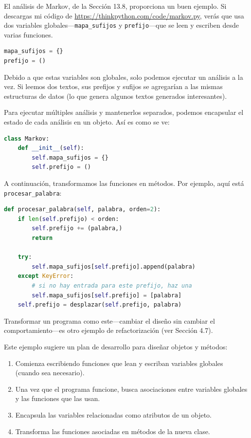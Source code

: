 El análisis de Markov, de la Sección 13.8, proporciona un buen ejemplo. Si descargas mi código de \url{https://thinkpython.com/code/markov.py}, verás que usa dos variables globales—\texttt{mapa\_sufijos} y \texttt{prefijo}—que se leen y escriben desde varias funciones.

\begin{lstlisting}[language=Python]
mapa_sufijos = {}
prefijo = ()
\end{lstlisting}

Debido a que estas variables son globales, solo podemos ejecutar un análisis a la vez. Si leemos dos textos, sus prefijos y sufijos se agregarían a las mismas estructuras de datos (lo que genera algunos textos generados interesantes).

Para ejecutar múltiples análisis y mantenerlos separados, podemos encapsular el estado de cada análisis en un objeto. Así es como se ve:

\begin{lstlisting}[language=Python]
class Markov:
    def __init__(self):
        self.mapa_sufijos = {}
        self.prefijo = ()
\end{lstlisting}

A continuación, transformamos las funciones en métodos. Por ejemplo, aquí está \texttt{procesar\_palabra}:

\begin{lstlisting}[language=Python]
def procesar_palabra(self, palabra, orden=2):
    if len(self.prefijo) < orden:
        self.prefijo += (palabra,)
        return

    try:
        self.mapa_sufijos[self.prefijo].append(palabra)
    except KeyError:
        # si no hay entrada para este prefijo, haz una
        self.mapa_sufijos[self.prefijo] = [palabra]
    self.prefijo = desplazar(self.prefijo, palabra)
\end{lstlisting}

Transformar un programa como este—cambiar el diseño sin cambiar el comportamiento—es otro ejemplo de refactorización (ver Sección 4.7).

Este ejemplo sugiere un plan de desarrollo para diseñar objetos y métodos:

\begin{enumerate}
    \item Comienza escribiendo funciones que lean y escriban variables globales (cuando sea necesario).
    \item Una vez que el programa funcione, busca asociaciones entre variables globales y las funciones que las usan.
    \item Encapsula las variables relacionadas como atributos de un objeto.
    \item Transforma las funciones asociadas en métodos de la nueva clase.
\end{enumerate}

